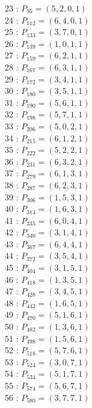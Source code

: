 \documentclass{article}
\begin{document}
{\begin{multicols}{3}
23 : $P_{95}=( 5, 2, 0, 1 )$\\
24 : $P_{112}=( 6, 4, 0, 1 )$\\
25 : $P_{133}=( 3, 7, 0, 1 )$\\
26 : $P_{139}=( 1, 0, 1, 1 )$\\
27 : $P_{159}=( 6, 2, 1, 1 )$\\
28 : $P_{167}=( 6, 3, 1, 1 )$\\
29 : $P_{172}=( 3, 4, 1, 1 )$\\
30 : $P_{180}=( 3, 5, 1, 1 )$\\
31 : $P_{190}=( 5, 6, 1, 1 )$\\
32 : $P_{198}=( 5, 7, 1, 1 )$\\
33 : $P_{206}=( 5, 0, 2, 1 )$\\
34 : $P_{215}=( 6, 1, 2, 1 )$\\
35 : $P_{222}=( 5, 2, 2, 1 )$\\
36 : $P_{231}=( 6, 3, 2, 1 )$\\
37 : $P_{279}=( 6, 1, 3, 1 )$\\
38 : $P_{287}=( 6, 2, 3, 1 )$\\
39 : $P_{306}=( 1, 5, 3, 1 )$\\
40 : $P_{314}=( 1, 6, 3, 1 )$\\
41 : $P_{335}=( 6, 0, 4, 1 )$\\
42 : $P_{340}=( 3, 1, 4, 1 )$\\
43 : $P_{367}=( 6, 4, 4, 1 )$\\
44 : $P_{372}=( 3, 5, 4, 1 )$\\
45 : $P_{404}=( 3, 1, 5, 1 )$\\
46 : $P_{418}=( 1, 3, 5, 1 )$\\
47 : $P_{428}=( 3, 4, 5, 1 )$\\
48 : $P_{442}=( 1, 6, 5, 1 )$\\
49 : $P_{470}=( 5, 1, 6, 1 )$\\
50 : $P_{482}=( 1, 3, 6, 1 )$\\
51 : $P_{498}=( 1, 5, 6, 1 )$\\
52 : $P_{518}=( 5, 7, 6, 1 )$\\
53 : $P_{524}=( 3, 0, 7, 1 )$\\
54 : $P_{534}=( 5, 1, 7, 1 )$\\
55 : $P_{574}=( 5, 6, 7, 1 )$\\
56 : $P_{580}=( 3, 7, 7, 1 )$\\
\end{multicols}


%


%


}%
\end{document}
